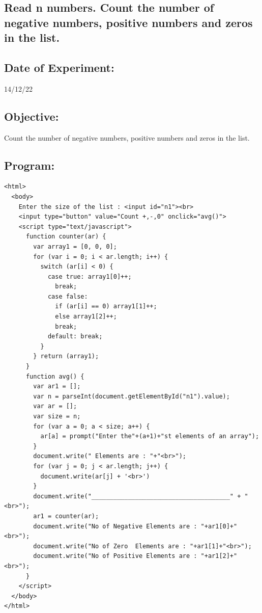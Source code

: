 \documentclass[12pt, a4paper]{article}
\begin{document}
\pagebreak

\begin{tcolorbox}
  \section{Read n numbers. Count the number of negative numbers, positive numbers and zeros in the list.}
\end{tcolorbox}
\subsection*{Date of Experiment:}
14/12/22
\subsection*{Objective:}
Count the number of negative numbers, positive numbers and zeros in the list.

\subsection*{Program:}
\begin{lstlisting}
<html>
  <body>
    Enter the size of the list : <input id="n1"><br>
    <input type="button" value="Count +,-,0" onclick="avg()">
    <script type="text/javascript">
      function counter(ar) {
        var array1 = [0, 0, 0];
        for (var i = 0; i < ar.length; i++) {
          switch (ar[i] < 0) {
            case true: array1[0]++;
              break;
            case false:
              if (ar[i] == 0) array1[1]++;
              else array1[2]++;
              break;
            default: break;
          }
        } return (array1);
      }
      function avg() {
        var ar1 = [];
        var n = parseInt(document.getElementById("n1").value);
        var ar = [];
        var size = n;
        for (var a = 0; a < size; a++) {
          ar[a] = prompt("Enter the"+(a+1)+"st elements of an array");
        }
        document.write(" Elements are : "+"<br>");
        for (var j = 0; j < ar.length; j++) {
          document.write(ar[j] + '<br>')
        }
        document.write("______________________________________" + "<br>");
        ar1 = counter(ar);
        document.write("No of Negative Elements are : "+ar1[0]+"<br>");
        document.write("No of Zero  Elements are : "+ar1[1]+"<br>");
        document.write("No of Positive Elements are : "+ar1[2]+"<br>");
      } 
    </script>
  </body>
</html>

\end{lstlisting}
\end{document}
